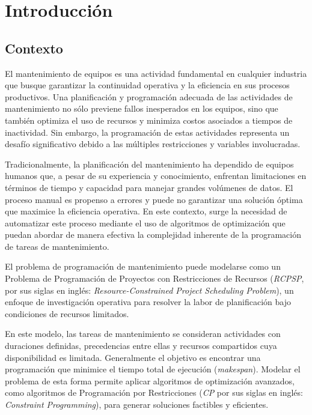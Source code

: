 \documentclass{article}
\begin{document}
\tableofcontents
\newpage

\section{Introducción}

\subsection{Contexto}
El mantenimiento de equipos es una actividad fundamental en cualquier industria que busque garantizar la continuidad operativa y la eficiencia en sus procesos productivos. Una planificación y programación adecuada de las actividades de mantenimiento no sólo previene fallos inesperados en los equipos, sino que también optimiza el uso de recursos y minimiza costos asociados a tiempos de inactividad. Sin embargo, la programación de estas actividades representa un desafío significativo debido a las múltiples restricciones y variables involucradas.

Tradicionalmente, la planificación del mantenimiento ha dependido de equipos humanos que, a pesar de su experiencia y conocimiento, enfrentan limitaciones en términos de tiempo y capacidad para manejar grandes volúmenes de datos. El proceso manual es propenso a errores y puede no garantizar una solución óptima que maximice la eficiencia operativa. En este contexto, surge la necesidad de automatizar este proceso mediante el uso de algoritmos de optimización que puedan abordar de manera efectiva la complejidad inherente de la programación de tareas de mantenimiento.

El problema de programación de mantenimiento puede modelarse como un Problema de Programación de Proyectos con Restricciones de Recursos (\textit{RCPSP}, por sus siglas en inglés: \textit{Resource-Constrained Project Scheduling Problem}), un enfoque de investigación operativa para resolver la labor de planificación bajo condiciones de recursos limitados.

En este modelo, las tareas de mantenimiento se consideran actividades con duraciones definidas, precedencias entre ellas y recursos compartidos cuya disponibilidad es limitada. Generalmente el objetivo es encontrar una programación que minimice el tiempo total de ejecución (\textit{makespan}). Modelar el problema de esta forma permite aplicar algoritmos de optimización avanzados, como algoritmos de Programación por Restricciones (\textit{CP} por sus siglas en inglés: \textit{Constraint Programming}), para generar soluciones factibles y eficientes.
\end{document}
